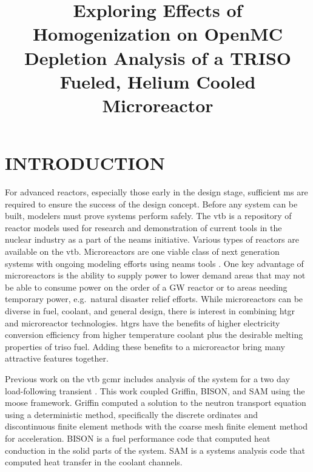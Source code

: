\documentclass[letterpaper]{physor2024}
\title{Exploring Effects of Homogenization on OpenMC Depletion Analysis of a TRISO Fueled, Helium Cooled Microreactor}
\begin{document}
\section{INTRODUCTION}\label{sec:intro}
For advanced reactors, especially those early in the design stage, sufficient \gls{ms} are required to ensure the success of the design concept. Before any system can be built, modelers must prove systems perform safely. The \gls{vtb} \cite{vtb2023} is a repository of reactor models used for research and demonstration of current tools in the nuclear industry as a part of the \gls{neams} initiative. Various types of reactors are available on the \gls{vtb}. Microreactors are one viable class of next generation systems with ongoing modeling efforts using \gls{neams} tools \cite{Stauff-preliminary-applications-2021, Stauff-applications-2022}. One key advantage of microreactors is the ability to supply power to lower demand areas that may not be able to consume power on the order of a GW reactor or to areas needing temporary power, e.g.~natural disaster relief efforts. While microreactors can be diverse in fuel, coolant, and general design, there is interest in combining \gls{htgr} and microreactor technologies. \glspl{htgr} have the benefits of higher electricity conversion efficiency from higher temperature coolant plus the desirable melting properties of \gls{triso} fuel. Adding these benefits to a microreactor bring many attractive features together.

Previous work on the \gls{vtb} \gls{gcmr} includes analysis of the system for a two day load-following transient \cite{Abdelhameed-ANS-2022}. This work coupled Griffin, BISON, and SAM using the \gls{moose} framework. Griffin computed a solution to the neutron transport equation using a deterministic method, specifically the discrete ordinates and discontinuous finite element methods with the coarse mesh finite element method for acceleration. BISON is a fuel performance code that computed heat conduction in the solid parts of the system. SAM is a systems analysis code that computed heat transfer in the coolant channels.
\end{document}
